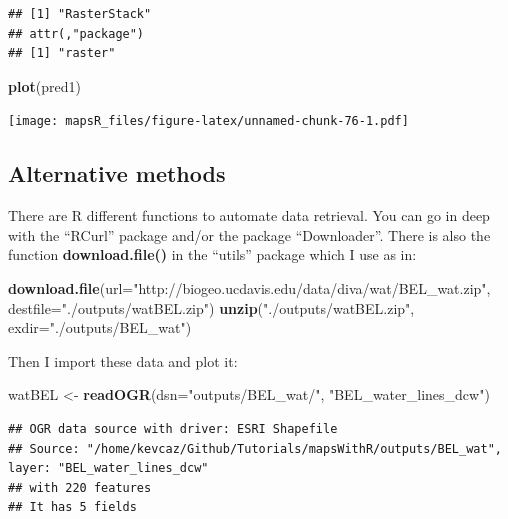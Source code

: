 \documentclass[]{report}
\newenvironment{Shaded}{\begin{snugshade}}{\end{snugshade}}
\newcommand{\DataTypeTok}[1]{\textcolor[rgb]{0.13,0.29,0.53}{#1}}
\newcommand{\KeywordTok}[1]{\textcolor[rgb]{0.13,0.29,0.53}{\textbf{#1}}}
\newcommand{\NormalTok}[1]{#1}
\newcommand{\StringTok}[1]{\textcolor[rgb]{0.31,0.60,0.02}{#1}}
\begin{document}
\begin{verbatim}
## [1] "RasterStack"
## attr(,"package")
## [1] "raster"
\end{verbatim}

\begin{Shaded}
\begin{Highlighting}[]
\KeywordTok{plot}\NormalTok{(pred1)}
\end{Highlighting}
\end{Shaded}

\texttt{[image: mapsR\_files/figure-latex/unnamed-chunk-76-1.pdf]}

\hypertarget{alternative-methods}{%
\subsection{Alternative methods}\label{alternative-methods}}

There are R different functions to automate data retrieval. You can go
in deep with the ``RCurl'' package and/or the package ``Downloader''.
There is also the function \textbf{download.file()} in the ``utils''
package which I use as in:

\begin{Shaded}
\begin{Highlighting}[]
\KeywordTok{download.file}\NormalTok{(}\DataTypeTok{url=}\StringTok{"http://biogeo.ucdavis.edu/data/diva/wat/BEL_wat.zip"}\NormalTok{, }\DataTypeTok{destfile=}\StringTok{"./outputs/watBEL.zip"}\NormalTok{)}
\KeywordTok{unzip}\NormalTok{(}\StringTok{"./outputs/watBEL.zip"}\NormalTok{, }\DataTypeTok{exdir=}\StringTok{"./outputs/BEL_wat"}\NormalTok{)}
\end{Highlighting}
\end{Shaded}

Then I import these data and plot it:

\begin{Shaded}
\begin{Highlighting}[]
\NormalTok{watBEL <-}\StringTok{ }\KeywordTok{readOGR}\NormalTok{(}\DataTypeTok{dsn=}\StringTok{"outputs/BEL_wat/"}\NormalTok{, }\StringTok{"BEL_water_lines_dcw"}\NormalTok{)}
\end{Highlighting}
\end{Shaded}

\begin{verbatim}
## OGR data source with driver: ESRI Shapefile 
## Source: "/home/kevcaz/Github/Tutorials/mapsWithR/outputs/BEL_wat", layer: "BEL_water_lines_dcw"
## with 220 features
## It has 5 fields
\end{verbatim}
\end{document}
